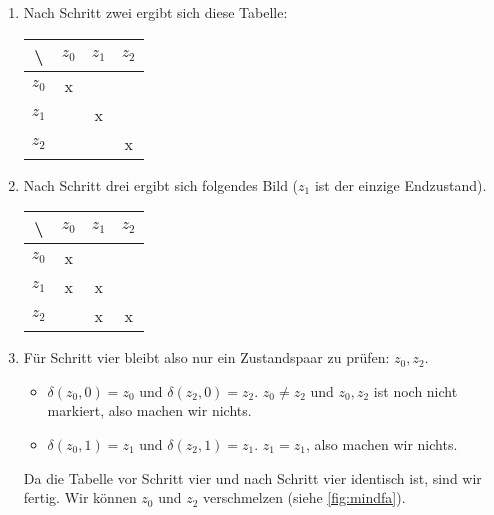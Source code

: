 \begin{enumerate}
    \item Nach Schritt zwei ergibt sich diese Tabelle:
        \begin{table}[H]
            \centering
            \begin{tabular}{|c|c|c|c|}
            \hline
                \textbackslash  & $z_0$   & $z_1$               & $z_2$ \\ \hline
                $z_0$           & x       & \cellcolor{gray}    & \cellcolor{gray} \\ \hline
                $z_1$           &         & x                   & \cellcolor{gray} \\ \hline
                $z_2$           &         &                     & x \\ \hline
            \end{tabular}
            \label{tab:mintab2}
        \end{table}
    \item Nach Schritt drei ergibt sich folgendes Bild ($z_1$ ist der einzige Endzustand).
        \begin{table}[H]
            \centering
            \begin{tabular}{|c|c|c|c|}
            \hline
                \textbackslash  & $z_0$   & $z_1$               & $z_2$ \\ \hline
                $z_0$           & x       & \cellcolor{gray}    & \cellcolor{gray} \\ \hline
                $z_1$           & x       & x                   & \cellcolor{gray} \\ \hline
                $z_2$           &         & x                   & x \\ \hline
            \end{tabular}
            \label{tab:mintab3}
        \end{table}
    \item Für Schritt vier bleibt also nur ein Zustandspaar zu prüfen: $z_0, z_2$.
        \begin{itemize}
            \item $\delta(z_0, 0) = z_0$ und $\delta(z_2, 0) = z_2$. 
                $z_0 \neq z_2$ und $z_0, z_2$ ist noch nicht markiert,
                also machen wir nichts.
            \item $\delta(z_0, 1) = z_1$ und $\delta(z_2, 1) = z_1$. 
                $z_1 = z_1$, also machen wir nichts.
        \end{itemize}
        Da die Tabelle vor Schritt vier und nach Schritt vier identisch ist,
        sind wir fertig. Wir können $z_0$ und $z_2$ verschmelzen
        (siehe \autoref{fig:mindfa}).
\end{enumerate}

